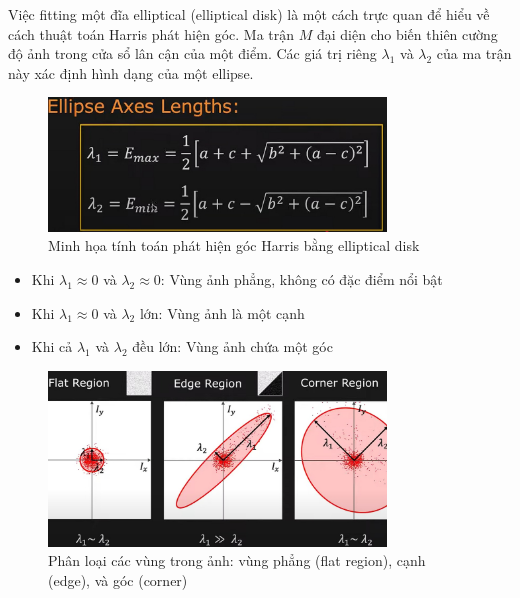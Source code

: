 \documentclass[12pt]{article}
\begin{document}
Việc fitting một đĩa elliptical (elliptical disk) là một cách trực quan để hiểu về cách thuật toán Harris phát hiện góc. Ma trận $M$ đại diện cho biến thiên cường độ ảnh trong cửa sổ lân cận của một điểm. Các giá trị riêng $\lambda_1$ và $\lambda_2$ của ma trận này xác định hình dạng của một ellipse.
\begin{figure}[htbp]
    \centering
    \includegraphics[width=0.8\textwidth]{img/fitting_an_elliptical_disk_calculation.jpg}
    \caption{Minh họa tính toán phát hiện góc Harris bằng elliptical disk}
    \label{fig:elliptical_disk_calculation}
\end{figure}
\begin{itemize}
    \item Khi $\lambda_1 \approx 0$ và $\lambda_2 \approx 0$: Vùng ảnh phẳng, không có đặc điểm nổi bật
    \item Khi $\lambda_1 \approx 0$ và $\lambda_2$ lớn: Vùng ảnh là một cạnh
    \item Khi cả $\lambda_1$ và $\lambda_2$ đều lớn: Vùng ảnh chứa một góc
\end{itemize}
\begin{figure}[htbp]
    \centering
    \includegraphics[width=0.8\textwidth]{img/region_types.jpg}
    \caption{Phân loại các vùng trong ảnh: vùng phẳng (flat region), cạnh (edge), và góc (corner)}
    \label{fig:region_types}
\end{figure}
\end{document}
